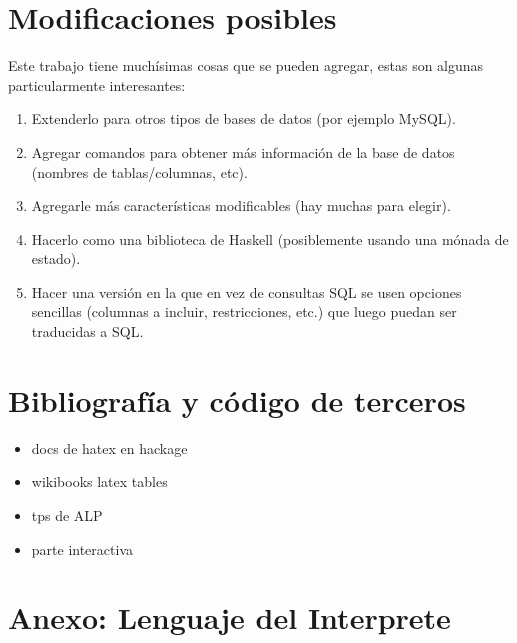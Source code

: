 \documentclass[a4paper,12pt]{article}
\begin{document}
\section{Modificaciones posibles}
Este trabajo tiene muchísimas cosas que se pueden agregar, estas son algunas particularmente interesantes:
\begin{enumerate}
\item Extenderlo para otros tipos de bases de datos (por ejemplo MySQL).
\item Agregar comandos para obtener más información de la base de datos (nombres de tablas/columnas, etc). %
\item Agregarle más características modificables (hay muchas para elegir).
\item Hacerlo como una biblioteca de Haskell (posiblemente usando una mónada de estado).
\item Hacer una versión en la que en vez de consultas SQL se usen opciones sencillas (columnas a incluir, restricciones, etc.) que luego puedan ser traducidas a SQL.
\end{enumerate}

\section{Bibliografía y código de terceros}
\begin{itemize}
\item docs de hatex en hackage
\item wikibooks latex tables
\item tps de ALP
\item parte interactiva
\end{itemize}

\section{Anexo: Lenguaje del Interprete}
\end{document}
